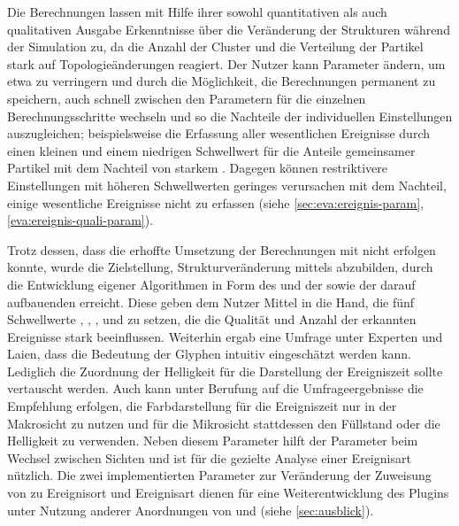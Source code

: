 Die Berechnungen lassen mit Hilfe ihrer sowohl quantitativen als auch qualitativen Ausgabe Erkenntnisse über die Veränderung der Strukturen während der Simulation zu, da die Anzahl der Cluster und die Verteilung der Partikel stark auf Topologieänderungen reagiert. Der Nutzer kann Parameter ändern, um etwa  zu verringern und durch die Möglichkeit, die Berechnungen permanent zu speichern, auch schnell zwischen den Parametern für die einzelnen Berechnungsschritte wechseln und so die Nachteile der individuellen Einstellungen auszugleichen; beispielsweise die Erfassung aller wesentlichen Ereignisse durch einen kleinen   und einem niedrigen Schwellwert für die Anteile gemeinsamer Partikel  mit dem Nachteil von starkem . Dagegen können restriktivere Einstellungen mit höheren Schwellwerten  geringes  verursachen mit dem Nachteil, einige wesentliche Ereignisse nicht zu erfassen (siehe \autoref{sec:eva:ereignis-param}, \autoref{eva:ereignis-quali-param}).

Trotz dessen, dass die erhoffte Umsetzung der Berechnungen mit  nicht erfolgen konnte, wurde die Zielstellung, Strukturveränderung mittels  abzubilden, durch die Entwicklung eigener Algorithmen in Form des \CFD und der \SECC sowie der darauf aufbauenden  erreicht. Diese geben dem Nutzer Mittel in die Hand, die fünf Schwellwerte , , ,  und  zu setzen, die die Qualität und Anzahl der erkannten Ereignisse stark beeinflussen. Weiterhin ergab eine Umfrage unter Experten und Laien, dass die Bedeutung der Glyphen intuitiv eingeschätzt werden kann. Lediglich die Zuordnung der Helligkeit für die Darstellung der Ereigniszeit sollte vertauscht werden. Auch kann unter Berufung auf die Umfrageergebnisse die Empfehlung erfolgen, die Farbdarstellung für die Ereigniszeit nur in der Makrosicht zu nutzen und für die Mikrosicht stattdessen den Füllstand oder die Helligkeit zu verwenden. Neben diesem Parameter  hilft der Parameter  beim Wechsel zwischen Sichten und  ist für die gezielte Analyse einer Ereignisart nützlich. Die zwei implementierten Parameter zur Veränderung der Zuweisung von  zu Ereignisort  und Ereignisart  dienen für eine Weiterentwicklung des Plugins unter Nutzung anderer Anordnungen von  und  (siehe \autoref{sec:ausblick}).

